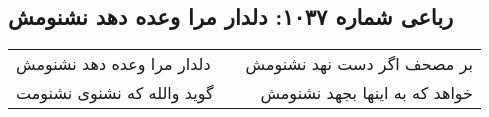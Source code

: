 \begin{center}
\section*{رباعی شماره ۱۰۳۷: دلدار مرا وعده دهد نشنومش}
\label{sec:1037}
\begin{longtable}{l p{0.5cm} r}
دلدار مرا وعده دهد نشنومش
&&
بر مصحف اگر دست نهد نشنومش
\\
گوید والله که نشنوی نشنومت
&&
خواهد که به اینها بجهد نشنومش
\\
\end{longtable}
\end{center}
